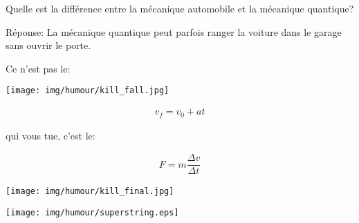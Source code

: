 	\begin{center}\underline{\hspace{5 cm}}\end{center}
	
	Quelle est la différence entre la mécanique automobile et la mécanique quantique?

	Réponse: La mécanique quantique peut parfois ranger la voiture dans le garage sans ouvrir le porte.
	
	\begin{center}\underline{\hspace{5 cm}}\end{center}
	
	\begin{center}
	Ce n'est pas le:
	
	\texttt{[image: img/humour/kill\_fall.jpg]}
	\end{center}
	\begin{gather*}
		v_f=v_0+at
	\end{gather*}
	\begin{center}
	qui vous tue, c'est le:
	\end{center}
	\begin{gather*}
		F=m\dfrac{\Delta v}{\Delta t}
	\end{gather*}
	
	\begin{center}
	\texttt{[image: img/humour/kill\_final.jpg]}
	\end{center}

	\begin{center}
	\texttt{[image: img/humour/superstring.eps]}
	\end{center}
	
\begin{center}\underline{\hspace{5 cm}}\end{center}
	
